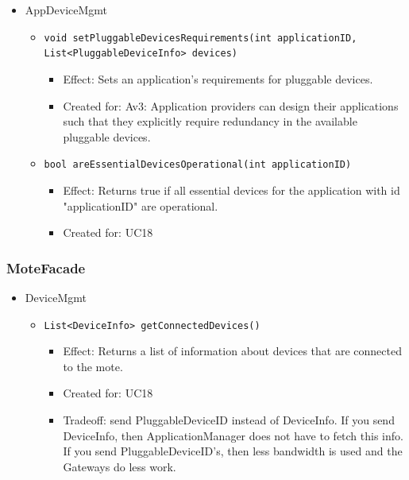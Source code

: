 \begin{itemize}
            \item AppDeviceMgmt
            \begin{itemize}
                \item \texttt{void setPluggableDevicesRequirements(int applicationID, List<PluggableDeviceInfo> devices)}
                \begin{itemize}
                    \item Effect: Sets an application's requirements for pluggable devices.
                    \item Created for: Av3: Application providers can design their applications
                          such that they explicitly require redundancy in
                          the available pluggable devices.
                \end{itemize}
                \item \texttt{bool areEssentialDevicesOperational(int applicationID)}
                \begin{itemize}
                    \item Effect: Returns true if all essential devices for the application
                                  with id "applicationID" are operational.
                    \item Created for: UC18
                \end{itemize}
            \end{itemize}
        \end{itemize}

    \subsubsection{MoteFacade}
        \begin{itemize}
            \item DeviceMgmt
            \begin{itemize}
                \item \texttt{List<DeviceInfo> getConnectedDevices()}
                \begin{itemize}
                    \item Effect: Returns a list of information about devices that are connected to the mote.
                    \item Created for: UC18
                    \item Tradeoff: send PluggableDeviceID instead of DeviceInfo.
                          If you send DeviceInfo, then ApplicationManager does
                          not have to fetch this info.
                          If you send PluggableDeviceID's, then less bandwidth
                          is used and the Gateways do less work.
                \end{itemize}
            \end{itemize}
        \end{itemize}

